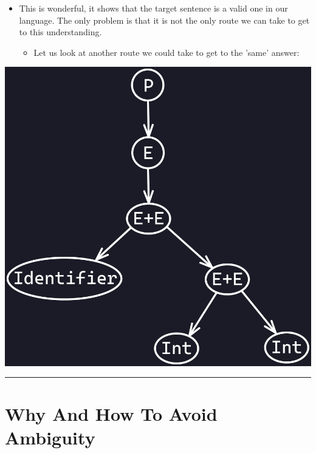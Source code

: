 \documentclass{article}
\begin{document}
\begin{itemize}
	\item This is wonderful, it shows that the target sentence is a valid one in our language. The only problem is that it is
		not the only route we can take to get to this understanding.
	\begin{itemize}
		\item Let us look at another route we could take to get to the 'same' answer:
	\end{itemize}
\end{itemize}
\begin{center}
	\includegraphics[scale=0.35]{image2.png}
\end{center}

\hrule

\section{Why And How To Avoid Ambiguity}
\end{document}
